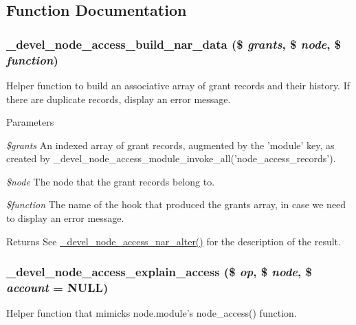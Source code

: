 \subsection{Function Documentation}
\hypertarget{devel__node__access_8module_ac95e8f567bfc44a460680bd2d676faaa}{
\subsubsection[{\_\-devel\_\-node\_\-access\_\-build\_\-nar\_\-data}]{\setlength{\rightskip}{0pt plus 5cm}\_\-devel\_\-node\_\-access\_\-build\_\-nar\_\-data (\$ {\em grants}, \/  \$ {\em node}, \/  \$ {\em function})}}
\label{devel__node__access_8module_ac95e8f567bfc44a460680bd2d676faaa}
Helper function to build an associative array of grant records and their history. If there are duplicate records, display an error message.


\begin{DoxyParams}{Parameters}
\item[{\em \$grants}]An indexed array of grant records, augmented by the 'module' key, as created by \_\-devel\_\-node\_\-access\_\-module\_\-invoke\_\-all('node\_\-access\_\-records').\item[{\em \$node}]The node that the grant records belong to.\item[{\em \$function}]The name of the hook that produced the grants array, in case we need to display an error message.\end{DoxyParams}
\begin{DoxyReturn}{Returns}
See \hyperlink{devel__node__access_8module_a4e53f1761aae77265e0b5fecfef17875}{\_\-devel\_\-node\_\-access\_\-nar\_\-alter()} for the description of the result. 
\end{DoxyReturn}
\hypertarget{devel__node__access_8module_a4cb1e534842f4b1976d02c7cd0f9958d}{
\subsubsection[{\_\-devel\_\-node\_\-access\_\-explain\_\-access}]{\setlength{\rightskip}{0pt plus 5cm}\_\-devel\_\-node\_\-access\_\-explain\_\-access (\$ {\em op}, \/  \$ {\em node}, \/  \$ {\em account} = {\ttfamily NULL})}}
\label{devel__node__access_8module_a4cb1e534842f4b1976d02c7cd0f9958d}
Helper function that mimicks node.module's node\_\-access() function.

